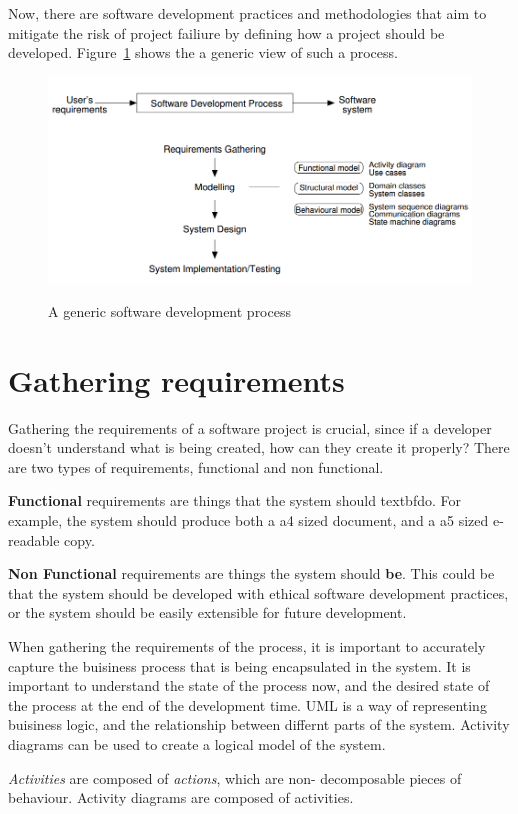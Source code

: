 Now, there are software development practices and methodologies that aim to
mitigate the risk of project failiure by defining how a project should be
developed. Figure~\ref{fig:gen-software-dev-process} shows the a generic view
of such a process.

\begin{figure}[!h]
  \includegraphics[width=\textwidth]{images/generic-software-dev-process.jpg}
  \label{fig:gen-software-dev-process}
  \caption{A generic software development process}
\end{figure}

\section{Gathering requirements}

Gathering the requirements of a software project is crucial, since if a
developer doesn't understand what is being created, how can they create it
properly? There are two types of requirements, functional and non functional.

\textbf{Functional} requirements are things that the system should textbf{do}.
For example, the system should produce both a a4 sized document, and a a5
sized e-readable copy.

\textbf{Non Functional} requirements are things the system should \textbf{be}.
This could be that the system should be developed with ethical software
development practices, or the system should be easily extensible for future
development.

When gathering the requirements of the process, it is important to accurately
capture the buisiness process that is being encapsulated in the system. It is
important to understand the state of the process now, and the desired state of
the process at the end of the development time. UML is a way of representing
buisiness logic, and the relationship between differnt parts of the system.
Activity diagrams can be used to create a logical model of the system.

\textit{Activities} are composed of \textit{actions}, which are non-
decomposable pieces of behaviour. Activity diagrams are composed of
activities.
